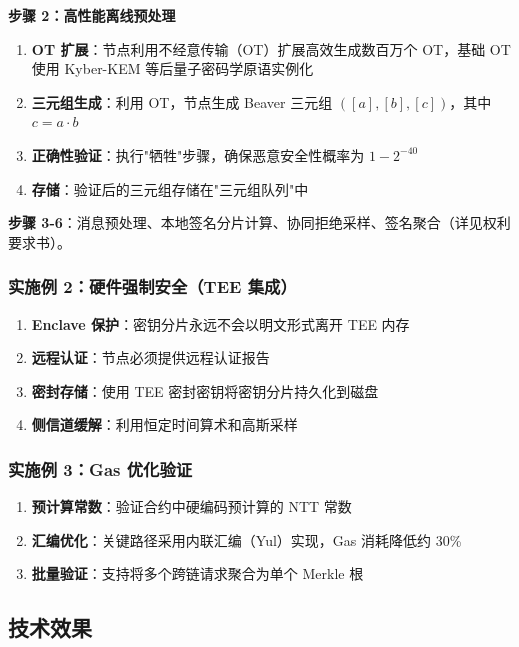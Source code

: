 \textbf{步骤 2：高性能离线预处理}

\begin{enumerate}
    \item \textbf{OT 扩展}：节点利用不经意传输（OT）扩展高效生成数百万个 OT，基础 OT 使用 Kyber-KEM 等后量子密码学原语实例化
    \item \textbf{三元组生成}：利用 OT，节点生成 Beaver 三元组 $([a], [b], [c])$，其中 $c = a \cdot b$
    \item \textbf{正确性验证}：执行"牺牲"步骤，确保恶意安全性概率为 $1 - 2^{-40}$
    \item \textbf{存储}：验证后的三元组存储在"三元组队列"中
\end{enumerate}

\textbf{步骤 3-6}：消息预处理、本地签名分片计算、协同拒绝采样、签名聚合（详见权利要求书）。

\subsubsection{实施例 2：硬件强制安全（TEE 集成）}

\begin{enumerate}
    \item \textbf{Enclave 保护}：密钥分片永远不会以明文形式离开 TEE 内存
    \item \textbf{远程认证}：节点必须提供远程认证报告
    \item \textbf{密封存储}：使用 TEE 密封密钥将密钥分片持久化到磁盘
    \item \textbf{侧信道缓解}：利用恒定时间算术和高斯采样
\end{enumerate}

\subsubsection{实施例 3：Gas 优化验证}

\begin{enumerate}
    \item \textbf{预计算常数}：验证合约中硬编码预计算的 NTT 常数
    \item \textbf{汇编优化}：关键路径采用内联汇编（Yul）实现，Gas 消耗降低约 30\%
    \item \textbf{批量验证}：支持将多个跨链请求聚合为单个 Merkle 根
\end{enumerate}

\subsection{技术效果}


